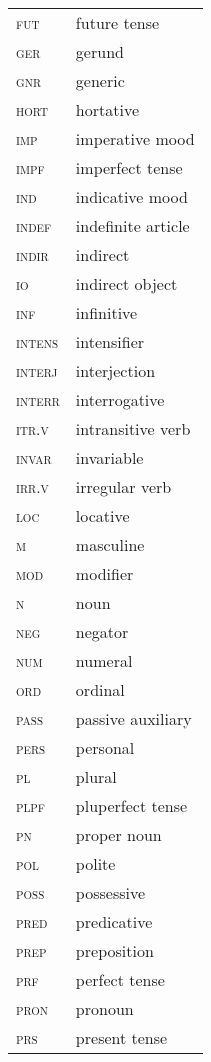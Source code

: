 \begin{tabularx}{.45\textwidth}{lQ}
\textsc{fut} & future tense\\
\textsc{ger} & gerund\\
\textsc{gnr} & generic\\
\textsc{hort} & hortative\\
	\textsc{imp} & imperative mood\\
	\textsc{impf} & imperfect tense\\
\textsc{ind} & indicative mood\\
\textsc{indef} & indefinite article\\
\textsc{indir} & indirect\\
\textsc{io} & indirect object\\
\textsc{inf} & infinitive\\
\textsc{intens} & intensifier\\
\textsc{interj} & interjection\\
\textsc{interr} & interrogative\\
\textsc{itr.v} & intransitive verb\\
\textsc{invar} & invariable\\
\textsc{irr.v} & irregular verb\\
\textsc{loc} & locative\\
\textsc{m} & masculine\\
\textsc{mod}\footnotemark & modifier\\
\textsc{n} & noun\\
\textsc{neg} & negator\\
\textsc{num} & numeral\\
\textsc{ord} & ordinal\\
\textsc{pass} & passive auxiliary\\
\textsc{pers} & personal\\
\textsc{pl} & plural\\
\textsc{plpf} & pluperfect tense\\
\textsc{pn} & proper noun\\
\textsc{pol} & polite\\
\textsc{poss} & possessive\\
\textsc{pred} & predicative\\
\textsc{prep} & preposition\\
\textsc{prf} & perfect tense\\
\textsc{pron} & pronoun\\
\textsc{prs} & present tense\\
\end{tabularx}

